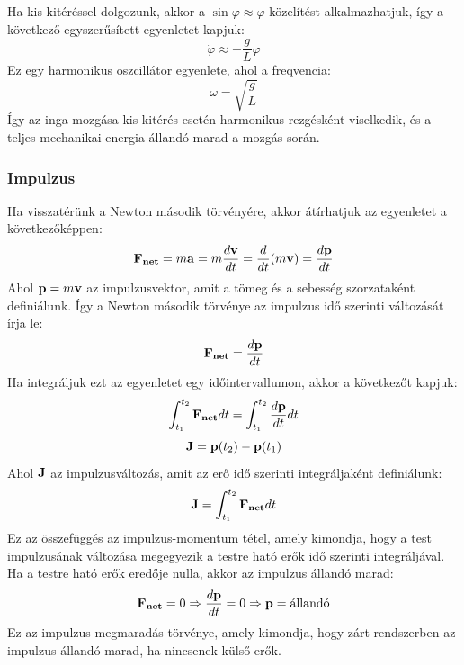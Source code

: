 \documentclass[a4paper,12pt]{article}
\begin{document}
Ha kis kitéréssel dolgozunk, akkor a $\sin\varphi \approx \varphi$ közelítést alkalmazhatjuk, így a következő egyszerűsített egyenletet kapjuk:
\begin{equation}
    \ddot{\varphi} \approx -\frac{g}{L} \varphi
\end{equation}
Ez egy harmonikus oszcillátor egyenlete, ahol a freqvencia:
\begin{equation}
    \omega = \sqrt{\frac{g}{L}}
\end{equation}
Így az inga mozgása kis kitérés esetén harmonikus rezgésként viselkedik, és a teljes mechanikai energia állandó marad a mozgás során.

\subsubsection{Impulzus}
Ha visszatérünk a Newton második törvényére, akkor átírhatjuk az egyenletet a következőképpen:
\begin{equation}
    \bold{F_{net}} = m\bold{a} = m\frac{d\bold{v}}{dt} = \frac{d}{dt}(m\bold{v}) = \frac{d\bold{p}}{dt}
\end{equation}
Ahol $\bold{p} = m\bold{v}$ az impulzusvektor, amit a tömeg és a sebesség szorzataként definiálunk. Így a Newton második törvénye az impulzus idő szerinti változását írja le:
\begin{equation}
    \bold{F_{net}} = \frac{d\bold{p}}{dt}
\end{equation}
Ha integráljuk ezt az egyenletet egy időintervallumon, akkor a következőt kapjuk:
\begin{equation}
    \int_{t_1}^{t_2} \bold{F_{net}} dt = \int_{t_1}^{t_2} \frac{d\bold{p}}{dt} dt
\end{equation}
\begin{equation}
    \bold{J} = \bold{p}(t_2) - \bold{p}(t_1)
\end{equation}
Ahol $\bold{J}$ az impulzusváltozás, amit az erő idő szerinti integráljaként definiálunk:
\begin{equation}
    \bold{J} = \int_{t_1}^{t_2} \bold{F_{net}} dt
\end{equation}
Ez az összefüggés az impulzus-momentum tétel, amely kimondja, hogy a test impulzusának változása megegyezik a testre ható erők idő szerinti integráljával. Ha a testre ható erők eredője nulla, akkor az impulzus állandó marad:
\begin{equation}
    \bold{F_{net}} = 0 \Rightarrow \frac{d\bold{p}}{dt} = 0 \Rightarrow \bold{p} = \text{állandó}
\end{equation}
Ez az impulzus megmaradás törvénye, amely kimondja, hogy zárt rendszerben az impulzus állandó marad, ha nincsenek külső erők.
\end{document}
